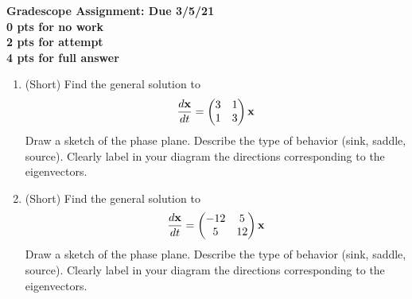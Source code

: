 \documentclass[a4paper,11pt]{article}
\newcommand{\bp}{\begin{pmatrix}}
\newcommand{\ep}{\end{pmatrix}}
\begin{document}
\begin{center}
{\bf Gradescope Assignment: Due 3/5/21\\
0 pts for no work\\ 2 pts for attempt\\ 4 pts for full answer}
\end{center}

\begin{enumerate}
\item (Short) Find the general solution to 
\[
\frac{d{\bf x}}{dt} = \bp 3 & 1 \\ 1 & 3 \ep {\bf x}
\]
Draw a sketch of the phase plane.  Describe the type of behavior (sink, saddle, source).  Clearly label in your diagram the directions corresponding to the eigenvectors.  
\item (Short)  Find the general solution to 
\[
\frac{d{\bf x}}{dt} = \bp -12 & 5 \\ 5 & 12 \ep {\bf x}
\]
Draw a sketch of the phase plane.  Describe the type of behavior (sink, saddle, source).  Clearly label in your diagram the directions corresponding to the eigenvectors.  
\end{enumerate}
\end{document}
